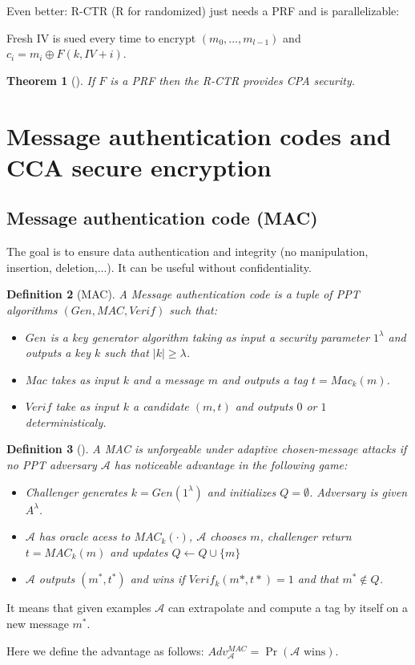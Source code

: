 \documentclass{article}
\newtheorem{thm}{Theorem}[section]
\newtheorem{defi}[thm]{Definition}
\newcommand{\Thm}[3]{\begin{thm}[#1]\label{#2}#3\end{thm}}
\newcommand{\Def}[3]{\begin{defi}[#1]\label{#2}#3\end{defi}}
\newcommand{\A}{\mathcal{A}}
\begin{document}
Even better: R-CTR (R for randomized) just needs a PRF and is parallelizable:

Fresh IV is sued every time to encrypt $(m_0,...,m_{l-1})$ and $c_i=m_i\oplus F(k,IV+i)$.

\Thm{}{def:RCTRsecure}{If $F$ is a PRF then the R-CTR provides CPA security.}

\section{Message authentication codes and CCA secure encryption}
\subsection{Message authentication code (MAC)}
The goal is to ensure data authentication and integrity (no manipulation, insertion, deletion,...). It can be useful without confidentiality.

\Def{MAC}{def:MAC}{A Message authentication code is a tuple of PPT algorithms $(Gen,MAC,Verif)$ such that:\begin{itemize}
\item $Gen$ is a key generator algorithm taking as input a security parameter $1^\lambda$ and outputs a key $k$ such that $|k|\geq\lambda$.
\item $Mac$ takes as input $k$ and a message $m$ and outputs a tag $t=Mac_k(m)$.
\item $Verif$ take as input $k$ a candidate $(m,t)$ and outputs $0$ or $1$ deterministicaly.
\end{itemize}}

\Def{}{def:unforgeadapt}{A MAC is unforgeable under adaptive chosen-message attacks if no PPT adversary $\A$ has noticeable advantage in the following game:\begin{itemize}
\item Challenger generates $k=Gen(1^\lambda)$ and initializes $Q=\emptyset$. Adversary is given $A^\lambda$.
\item $\A$ has oracle acess to $MAC_k(\cdot)$, $\A$ chooses $m$, challenger return $t=MAC_k(m)$ and updates $Q\leftarrow Q\cup\{m\}$
\item $\A$ outputs $(m^*,t^*)$ and wins if $Verif_k(m*,t*)=1$ and that $m^*\notin Q$.
\end{itemize}}

It means that given examples $\A$ can extrapolate and compute a tag by itself on a new message $m^*$.

Here we define the advantage as follows: $Adv_\A^{MAC}=\Pr(\A\text{ wins})$.
\end{document}
